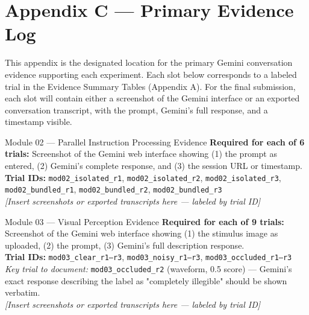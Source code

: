 \documentclass[12pt, a4paper]{article}
\begin{document}
\newpage

\section{Appendix C — Primary Evidence Log}
\label{sec:evidence_log}

This appendix is the designated location for the primary Gemini conversation evidence supporting each experiment. Each slot below corresponds to a labeled trial in the Evidence Summary Tables (Appendix A). For the final submission, each slot will contain either a screenshot of the Gemini interface or an exported conversation transcript, with the prompt, Gemini's full response, and a timestamp visible.

\begin{auditbox}{Module 02 — Parallel Instruction Processing Evidence}
\textbf{Required for each of 6 trials:} Screenshot of the Gemini web interface showing (1) the prompt as entered, (2) Gemini's complete response, and (3) the session URL or timestamp.\\[0.3em]
\textbf{Trial IDs:} \texttt{mod02\_isolated\_r1}, \texttt{mod02\_isolated\_r2}, \texttt{mod02\_isolated\_r3}, \texttt{mod02\_bundled\_r1}, \texttt{mod02\_bundled\_r2}, \texttt{mod02\_bundled\_r3}\\[0.3em]
\textit{[Insert screenshots or exported transcripts here — labeled by trial ID]}
\end{auditbox}

\begin{auditbox}{Module 03 — Visual Perception Evidence}
\textbf{Required for each of 9 trials:} Screenshot of the Gemini web interface showing (1) the stimulus image as uploaded, (2) the prompt, (3) Gemini's full description response.\\[0.3em]
\textbf{Trial IDs:} \texttt{mod03\_clear\_r1--r3}, \texttt{mod03\_noisy\_r1--r3}, \texttt{mod03\_occluded\_r1--r3}\\[0.3em]
\textit{Key trial to document:} \texttt{mod03\_occluded\_r2} (waveform, 0.5 score) — Gemini's exact response describing the label as "completely illegible" should be shown verbatim.\\[0.3em]
\textit{[Insert screenshots or exported transcripts here — labeled by trial ID]}
\end{auditbox}
\end{document}
